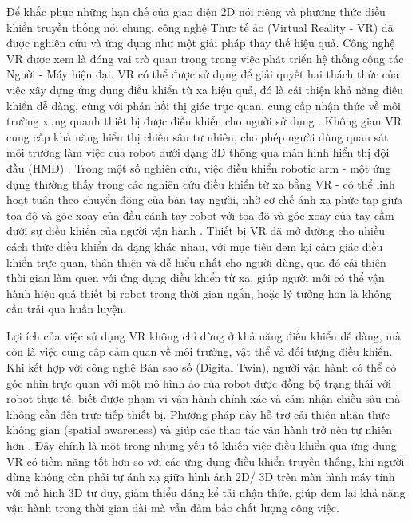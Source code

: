 Để khắc phục những hạn chế của giao diện 2D nói riêng và phương thức điều khiển truyền thống nói chung, công nghệ Thực tế ảo (Virtual Reality - VR) đã được nghiên cứu và ứng dụng như một giải pháp thay thế hiệu quả. Công nghệ VR được xem là đóng vai trò quan trọng trong việc phát triển hệ thống cộng tác Người - Máy hiện đại. VR có thể được sử dụng để giải quyết hai thách thức của việc xây dựng ứng dụng điều khiển từ xa hiệu quả, đó là cải thiện khả năng điều khiển dễ dàng, cùng với phản hồi thị giác trực quan, cung cấp nhận thức về môi trường xung quanh thiết bị được điều khiển cho người sử dụng \cite{Luu2025EnhancingRealTime}. Không gian VR cung cấp khả năng hiển thị chiều sâu tự nhiên, cho phép người dùng quan sát môi trường làm việc của robot dưới dạng 3D thông qua màn hình hiển thị đội đầu (HMD) \cite{arclab2025beavr}. Trong một số nghiên cứu, việc điều khiển robotic arm - một ứng dụng thường thấy trong các nghiên cứu điều khiển từ xa bằng VR - có thể linh hoạt tuân theo chuyển động của bàn tay người, nhờ cơ chế ánh xạ phức tạp giữa tọa độ và góc xoay của đầu cánh tay robot với tọa độ và góc xoay của tay cầm dưới sự điều khiển của người vận hành \cite{Su2022MixedRealityEnhancedHI}. Thiết bị VR đã mở đường cho nhiều cách thức điều khiển đa dạng khác nhau, với mục tiêu đem lại cảm giác điều khiển trực quan, thân thiện và dễ hiểu nhất cho người dùng, qua đó cải thiện thời gian làm quen với ứng dụng điều khiển từ xa, giúp người mới có thể vận hành hiệu quả thiết bị robot trong thời gian ngắn, hoặc lý tưởng hơn là không cần trải qua huấn luyện. 

Lợi ích của việc sử dụng VR không chỉ dừng ở khả năng điều khiển dễ dàng, mà còn là việc cung cấp cảm quan về môi trường, vật thể và đối tượng điều khiển. Khi kết hợp với công nghệ Bản sao số (Digital Twin), người vận hành có thể có góc nhìn trực quan với một mô hình ảo của robot được đồng bộ trạng thái với robot thực tế, biết được phạm vi vận hành chính xác và cảm nhận chiều sâu mà không cần đến trực tiếp thiết bị. Phương pháp này hỗ trợ cải thiện nhận thức không gian (spatial awareness) và giúp các thao tác vận hành trở nên tự nhiên hơn \cite{torrejon2026teleoperation}. Đây chính là một trong những yếu tố khiến việc điều khiển qua ứng dụng VR có tiềm năng tốt hơn so với các ứng dụng điều khiển truyền thống, khi người dùng không còn phải tự ánh xạ giữa hình ảnh 2D/ 3D trên màn hình máy tính với mô hình 3D tư duy, giảm thiểu đáng kể tải nhận thức, giúp đem lại khả năng vận hành trong thời gian dài mà vẫn đảm bảo chất lượng công việc. 

